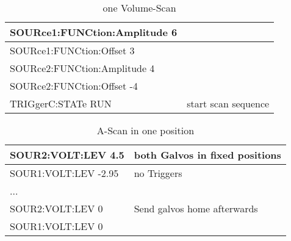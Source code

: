 	{	\begin{table}[h!]
		\scriptsize
			 \begin{tabular}{|p{5.5cm}|p{6cm}|} \hline
			SOURce1:FUNCtion:Amplitude 6	&	\\ \hline
			SOURce1:FUNCtion:Offset 3		&	\\ \hline
			SOURce2:FUNCtion:Amplitude 4	&	\\ \hline
			SOURce2:FUNCtion:Offset -4		&	\\ \hline
			TRIGgerC:STATe RUN				&	start scan sequence\\ \hline
			 \end{tabular}
			 \caption{one Volume-Scan}
		\end{table}
	}
		\begin{table}[h!]
		\scriptsize
			 \begin{tabular}{|p{5.5cm}|p{6cm}|} \hline
			SOUR2:VOLT:LEV 4.5		& both Galvos in fixed positions	\\ \hline
			SOUR1:VOLT:LEV -2.95	& no Triggers	\\ \hline
			...	& 	\\ \hline
			SOUR2:VOLT:LEV 0	& Send galvos home afterwards	\\ \hline
			SOUR1:VOLT:LEV 0	& 	\\ \hline
			 \end{tabular}
			 \caption{A-Scan in one position }
		\end{table}

